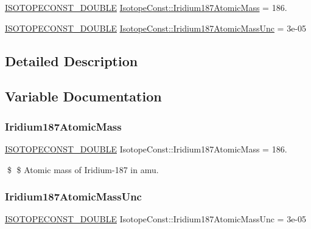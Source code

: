 \begin{DoxyCompactItemize}
\item 
\mbox{\hyperlink{group___isotope_const-_macros_ga8f45a7272ce02c0b4c65c44636ed719a}{I\+S\+O\+T\+O\+P\+E\+C\+O\+N\+S\+T\+\_\+\+D\+O\+U\+B\+LE}} \mbox{\hyperlink{group___isotope_const-_iridium-_ir187_gadc520ec1580d525a7dd7b3970353b3b3}{Isotope\+Const\+::\+Iridium187\+Atomic\+Mass}} = 186.
\item 
\mbox{\hyperlink{group___isotope_const-_macros_ga8f45a7272ce02c0b4c65c44636ed719a}{I\+S\+O\+T\+O\+P\+E\+C\+O\+N\+S\+T\+\_\+\+D\+O\+U\+B\+LE}} \mbox{\hyperlink{group___isotope_const-_iridium-_ir187_ga9e643722cf098ed8efa26c95de100f85}{Isotope\+Const\+::\+Iridium187\+Atomic\+Mass\+Unc}} = 3e-\/05
\end{DoxyCompactItemize}


\subsection{Detailed Description}


\subsection{Variable Documentation}
\mbox{\label{group___isotope_const-_iridium-_ir187_gadc520ec1580d525a7dd7b3970353b3b3}} 
\subsubsection{\texorpdfstring{Iridium187\+Atomic\+Mass}{Iridium187AtomicMass}}
{\footnotesize\ttfamily \mbox{\hyperlink{group___isotope_const-_macros_ga8f45a7272ce02c0b4c65c44636ed719a}{I\+S\+O\+T\+O\+P\+E\+C\+O\+N\+S\+T\+\_\+\+D\+O\+U\+B\+LE}} Isotope\+Const\+::\+Iridium187\+Atomic\+Mass = 186.}

\$ \$ Atomic mass of Iridium-\/187 in amu. \mbox{\label{group___isotope_const-_iridium-_ir187_ga9e643722cf098ed8efa26c95de100f85}} 
\subsubsection{\texorpdfstring{Iridium187\+Atomic\+Mass\+Unc}{Iridium187AtomicMassUnc}}
{\footnotesize\ttfamily \mbox{\hyperlink{group___isotope_const-_macros_ga8f45a7272ce02c0b4c65c44636ed719a}{I\+S\+O\+T\+O\+P\+E\+C\+O\+N\+S\+T\+\_\+\+D\+O\+U\+B\+LE}} Isotope\+Const\+::\+Iridium187\+Atomic\+Mass\+Unc = 3e-\/05}

